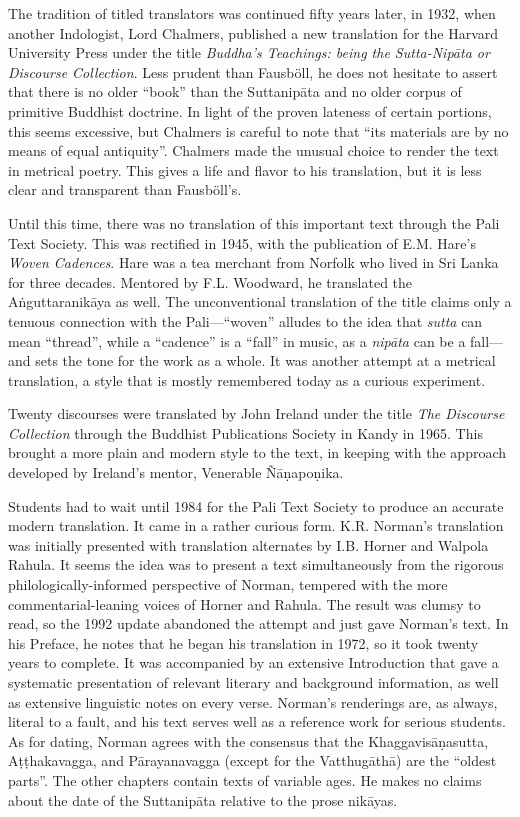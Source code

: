 \documentclass[12pt,openany]{book}%
\begin{document}
The tradition of titled translators was continued fifty years later, in 1932, when another Indologist, Lord Chalmers, published a new translation for the Harvard University Press under the title \textit{Buddha’s Teachings: being the Sutta-\textsanskrit{Nipāta} or Discourse Collection}. Less prudent than Fausböll, he does not hesitate to assert that there is no older “book” than the \textsanskrit{Suttanipāta} and no older corpus of primitive Buddhist doctrine. In light of the proven lateness of certain portions, this seems excessive, but Chalmers is careful to note that “its materials are by no means of equal antiquity”. Chalmers made the unusual choice to render the text in metrical poetry. This gives a life and flavor to his translation, but it is less clear and transparent than Fausböll’s.

Until this time, there was no translation of this important text through the Pali Text Society. This was rectified in 1945, with the publication of E.M. Hare’s \textit{Woven Cadences}. Hare was a tea merchant from Norfolk who lived in Sri Lanka for three decades. Mentored by F.L. Woodward, he translated the \textsanskrit{Aṅguttaranikāya} as well. The unconventional translation of the title claims only a tenuous connection with the Pali—“woven” alludes to the idea that \textit{sutta} can mean “thread”, while a “cadence” is a “fall” in music, as a \textit{\textsanskrit{nipāta}} can be a fall—and sets the tone for the work as a whole. It was another attempt at a metrical translation, a style that is mostly remembered today as a curious experiment.

Twenty discourses were translated by John Ireland under the title \textit{The Discourse Collection} through the Buddhist Publications Society in Kandy in 1965. This brought a more plain and modern style to the text, in keeping with the approach developed by Ireland’s mentor, Venerable \textsanskrit{Ñāṇapoṇika}.

Students had to wait until 1984 for the Pali Text Society to produce an accurate modern translation. It came in a rather curious form. K.R. Norman’s translation was initially presented with translation alternates by I.B. Horner and Walpola Rahula. It seems the idea was to present a text simultaneously from the rigorous philologically-informed perspective of Norman, tempered with the more commentarial-leaning voices of Horner and Rahula. The result was clumsy to read, so the 1992 update abandoned the attempt and just gave Norman’s text. In his Preface, he notes that he began his translation in 1972, so it took twenty years to complete. It was accompanied by an extensive Introduction that gave a systematic presentation of relevant literary and background information, as well as extensive linguistic notes on every verse. Norman’s renderings are, as always, literal to a fault, and his text serves well as a reference work for serious students. As for dating, Norman agrees with the consensus that the \textsanskrit{Khaggavisāṇasutta}, \textsanskrit{Aṭṭhakavagga}, and \textsanskrit{Pārayanavagga} (except for the \textsanskrit{Vatthugāthā}) are the “oldest parts”. The other chapters contain texts of variable ages. He makes no claims about the date of the \textsanskrit{Suttanipāta} relative to the prose \textsanskrit{nikāyas}.
\end{document}
